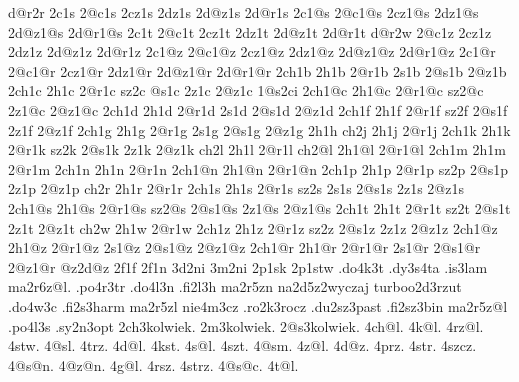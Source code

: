 {                                            d@r2r
  2c1s    2@c1s   2cz1s    2dz1s   2d@z1s  2d@r1s
  2c1@s   2@c1@s  2cz1@s   2dz1@s  2d@z1@s 2d@r1@s
  2c1t    2@c1t   2cz1t    2dz1t   2d@z1t  2d@r1t
                                            d@r2w   
          2@c1z   2cz1z    2dz1z   2d@z1z  2d@r1z
  2c1@z   2@c1@z  2cz1@z   2dz1@z  2d@z1@z 2d@r1@z
  2c1@r   2@c1@r  2cz1@r   2dz1@r  2d@z1@r 2d@r1@r
%
  2ch1b   2h1b    2@r1b            2s1b    2@s1b            2@z1b 
  2ch1c   2h1c    2@r1c     sz2c            @s1c    2z1c    2@z1c 
                                           1@s2ci   
  2ch1@c  2h1@c   2@r1@c    sz2@c                   2z1@c   2@z1@c
  2ch1d   2h1d    2@r1d            2s1d    2@s1d            2@z1d  
  2ch1f   2h1f    2@r1f     sz2f           2@s1f    2z1f    2@z1f 
  2ch1g   2h1g    2@r1g            2s1g    2@s1g            2@z1g       
          2h1h                                          
   ch2j   2h1j    2@r1j                                 
  2ch1k   2h1k    2@r1k     sz2k           2@s1k    2z1k    2@z1k  
   ch2l   2h1l    2@r1l                                 
   ch2@l  2h1@l   2@r1@l                                 
  2ch1m   2h1m    2@r1m                                 
  2ch1n   2h1n    2@r1n                                 
  2ch1@n  2h1@n   2@r1@n                                 
  2ch1p   2h1p    2@r1p     sz2p           2@s1p    2z1p    2@z1p 
   ch2r   2h1r    2@r1r                                 
  2ch1s   2h1s    2@r1s     sz2s   2s1s    2@s1s    2z1s    2@z1s
  2ch1@s  2h1@s   2@r1@s    sz2@s          2@s1@s   2z1@s   2@z1@s
  2ch1t   2h1t    2@r1t     sz2t           2@s1t    2z1t    2@z1t  
   ch2w   2h1w    2@r1w                                 
  2ch1z   2h1z    2@r1z     sz2z           2@s1z    2z1z    2@z1z      
  2ch1@z  2h1@z   2@r1@z           2s1@z   2@s1@z           2@z1@z
  2ch1@r  2h1@r   2@r1@r           2s1@r   2@s1@r           2@z1@r 
                                                             @z2d@z
%
  2f1f     2f1n
%
%
  3d2ni    3m2ni    2p1sk  2p1stw
%
  .do4k3t       .dy3s4ta      .is3lam     ma2r6z@l.       .po4r3tr   
  .do4l3n       .fi2l3h       ma2r5zn     na2d5z2wyczaj   turboo2d3rzut   
  .do4w3c       .fi2s3harm    ma2r5zl     nie4m3cz        .ro2k3rocz    
  .du2sz3past   .fi2sz3bin    ma2r5z@l    .po4l3s         .sy2n3opt   
%
  2ch3kolwiek.     2m3kolwiek.     2@s3kolwiek.
%
%
  4ch@l.      4k@l.       4rz@l.      4stw.       4@sl.       4trz.    
  4d@l.       4kst.       4s@l.       4szt.       4@sm.       4z@l.    
  4d@z.       4prz.       4str.       4szcz.      4@s@n.      4@z@n.   
  4g@l.       4rsz.       4strz.      4@s@c.      4t@l.    
}
 
